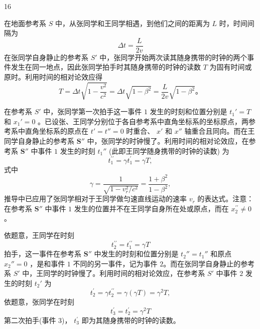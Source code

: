 \begin{solution}{16}
\begin{subsolution}
在地面参考系 $S$ 中，从张同学和王同学相遇，到他们之间的距离为 $L$ 时，时间间隔为
\begin{equation}
\Delta t = \frac {L}{2 v}
\label{eq:1.s16}
\end{equation}
在张同学自身静止的参考系 $S'$ 中，张同学开始两次读其随身携带的时钟的两个事件发生在同一地点，因此张同学拍手时其随身携带的时钟的读数 $T$ 为固有时间或原时。利用时间的相对论效应得
\begin{equation}
T = \Delta t \sqrt {1 - \frac {v ^ {2}}{c ^ {2}}} = \Delta t \sqrt {1 - \beta^ {2}} = \frac {L}{2 v} \sqrt {1 - \beta^ {2}}。
\label{eq:2.s16}
\end{equation}
\end{subsolution}

\begin{subsolution}
在参考系 $S'$ 中，张同学第一次拍手这一事件 $1$ 发生的时刻和位置分别是 $t_1' = T$ 和 $x_1' = 0$ 。已设张、王同学分别位于各自参考系中直角坐标系的坐标原点，两参考系中直角坐标系的原点在 $t' = t'' = 0$ 时重合、 $x'$ 和 $x''$ 轴重合且同向。而在王同学自身静止的参考系 $\mathbf{S}''$ 中，张同学的时钟慢了。利用时间的相对论效应，在参考系 $\mathbf{S}''$ 中事件 $1$ 发生的时刻 $t_1''$ (此即王同学随身携带的时钟的读数) 为
\begin{equation}
t _ {1} ^ {\prime \prime} = \gamma t _ {1} ^ {\prime} = \gamma T,
\label{eq:3.s16}
\end{equation}
式中
\begin{equation}
\gamma = \frac {1}{\sqrt {1 - v _ {r} ^ {2} / c ^ {2}}} = \frac {1 + \beta^ {2}}{1 - \beta^ {2}},
\label{eq:4.s16}
\end{equation}
推导中已应用了张同学相对于王同学做匀速直线运动的速率 $v_{r}$ 的表达式。注意：在参考系 $\mathbf{S}''$ 中事件 $1$ 发生的位置并不在王同学自身所在处或原点，而在 $x_{2}^{\prime \prime} \neq 0$ 。

依题意，王同学在时刻
\begin{equation}
t _ {2} ^ {\prime \prime} = t _ {1} ^ {\prime \prime} = \gamma T
\label{eq:5.s16}
\end{equation}
拍手，这一事件在参考系 $\mathbf{S}''$ 中发生的时刻和位置分别是 $t_2'' = t_1''$ 和原点 $x_2'' = 0$ ，是和事件 $1$ 不同的另一事件，记为事件 $2$。而在张同学自身静止的参考系 $S'$ 中，王同学的时钟慢了。利用时间的相对论效应，在参考系 $S'$ 中事件 $2$ 发生的时刻 $t_2'$ 为
\begin{equation}
t _ {2} ^ {\prime} = \gamma t _ {2} ^ {\prime \prime} = \gamma (\gamma T) = \gamma^ {2} T,
\label{eq:6.s16}
\end{equation}
依题意，张同学在时刻
\begin{equation}
t _ {3} ^ {\prime} = t _ {2} ^ {\prime} = \gamma^ {2} T
\label{eq:7.s16}
\end{equation}
第二次拍手(事件 $3$)， $t_{3}^{\prime}$ 即为其随身携带的时钟的读数。


\end{subsolution}
\end{solution}
